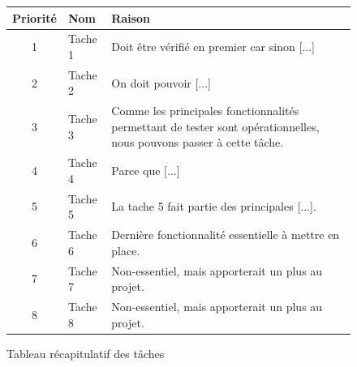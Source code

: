 \begin{figure}[!h]
\begin{center}
\begin{tabularx}{17cm}{|c|p{6cm}|X|}
 \hline
 Priorité & Nom & Raison\\
 \hline
 1 & Tache 1 & Doit être vérifié en premier car sinon [...] \tabularnewline
 2 & Tache 2 & On doit pouvoir [...] \tabularnewline
 3 & Tache 3 & Comme les principales fonctionnalités permettant de tester sont opérationnelles, nous pouvons passer à cette tâche. \tabularnewline
 4 & Tache 4 & Parce que [...] \tabularnewline
 5 & Tache 5 & La tache 5 fait partie des principales [...]. \tabularnewline
 6 & Tache 6 & Dernière fonctionnalité essentielle à mettre en place. \tabularnewline
 7 & Tache 7 & Non-essentiel, mais apporterait un plus au projet. \tabularnewline
 8 & Tache 8 & Non-essentiel, mais apporterait un plus au projet. \tabularnewline
 \hline
\end{tabularx}
\end{center}
\caption{Tableau récapitulatif des tâches}
\end{figure}
